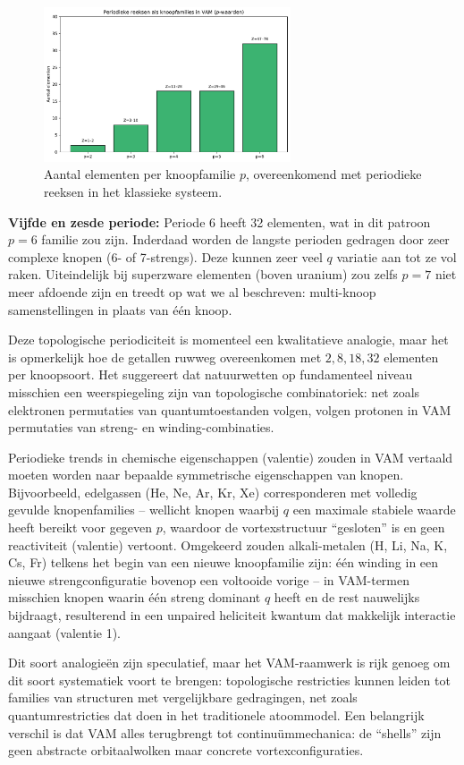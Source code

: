 \begin{figure}[H]
    \centering
    \includegraphics[width=0.65\textwidth]{sections/4_KnoopFamilies}
    \caption{Aantal elementen per knoopfamilie $p$, overeenkomend met periodieke reeksen in het klassieke systeem.}
    \label{fig:knoopfamilies}
\end{figure}

\textbf{Vijfde en zesde periode:} Periode 6 heeft 32 elementen, wat in dit patroon $p=6$ familie zou zijn. Inderdaad worden de langste perioden gedragen door zeer complexe knopen (6- of 7-strengs). Deze kunnen zeer veel $q$ variatie aan tot ze vol raken. Uiteindelijk bij superzware elementen (boven uranium) zou zelfs $p=7$ niet meer afdoende zijn en treedt op wat we al beschreven: multi-knoop samenstellingen in plaats van één knoop.

Deze topologische periodiciteit is momenteel een kwalitatieve analogie, maar het is opmerkelijk hoe de getallen ruwweg overeenkomen met $2, 8, 18, 32$ elementen per knoopsoort. Het suggereert dat natuurwetten op fundamenteel niveau misschien een weerspiegeling zijn van topologische combinatoriek: net zoals elektronen permutaties van quantumtoestanden volgen, volgen protonen in VAM permutaties van streng- en winding-combinaties.

Periodieke trends in chemische eigenschappen (valentie) zouden in VAM vertaald moeten worden naar bepaalde symmetrische eigenschappen van knopen. Bijvoorbeeld, edelgassen (He, Ne, Ar, Kr, Xe) corresponderen met volledig gevulde knopenfamilies – wellicht knopen waarbij $q$ een maximale stabiele waarde heeft bereikt voor gegeven $p$, waardoor de vortexstructuur “gesloten” is en geen reactiviteit (valentie) vertoont. Omgekeerd zouden alkali-metalen (H, Li, Na, K, Cs, Fr) telkens het begin van een nieuwe knoopfamilie zijn: één winding in een nieuwe strengconfiguratie bovenop een voltooide vorige – in VAM-termen misschien knopen waarin één streng dominant $q$ heeft en de rest nauwelijks bijdraagt, resulterend in een unpaired heliciteit kwantum dat makkelijk interactie aangaat (valentie 1).

Dit soort analogieën zijn speculatief, maar het VAM-raamwerk is rijk genoeg om dit soort systematiek voort te brengen: topologische restricties kunnen leiden tot families van structuren met vergelijkbare gedragingen, net zoals quantumrestricties dat doen in het traditionele atoommodel. Een belangrijk verschil is dat VAM alles terugbrengt tot continuümmechanica: de “shells” zijn geen abstracte orbitaalwolken maar concrete vortexconfiguraties.
